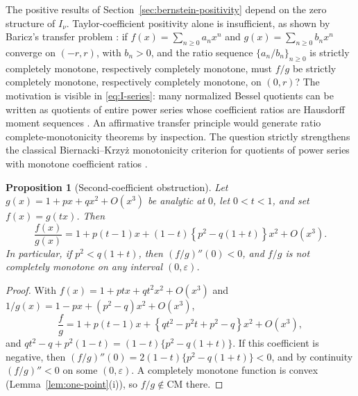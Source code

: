 \documentclass[preprint,12pt]{elsarticle}
\theoremstyle{plain}
\newtheorem{proposition}[theorem]{Proposition}
\theoremstyle{definition}
\theoremstyle{remark}
\newcommand{\CM}{\mathrm{CM}}
\begin{document}
The positive results of Section~\ref{sec:bernstein-positivity} depend on the
zero structure of \(I_\nu\). Taylor-coefficient positivity alone is
insufficient, as shown by Baricz's transfer problem
\cite[Problem~4.3(c)]{baricz-bounds}: if
\(f(x)=\sum_{n\ge0}a_nx^n\) and \(g(x)=\sum_{n\ge0}b_nx^n\) converge on
\((-r,r)\), with \(b_n>0\), and the ratio sequence
\(\{a_n/b_n\}_{n\ge0}\) is strictly completely monotone, respectively
completely monotone, must \(f/g\) be strictly completely monotone,
respectively completely monotone, on \((0,r)\)? The motivation is visible in
\eqref{eq:I-series}: many normalized Bessel quotients can be written as
quotients of entire power series whose coefficient ratios are Hausdorff
moment sequences \cite{hausdorff}. An affirmative transfer principle would
generate ratio complete-monotonicity theorems by inspection. The question
strictly strengthens the classical Biernacki--Krzy\.z monotonicity criterion
for quotients of power series with monotone coefficient ratios
\cite{biernacki-krzyz}.

\begin{proposition}[Second-coefficient obstruction]\label{prop:second-coeff}
Let \(g(x)=1+px+qx^2+O(x^3)\) be analytic at \(0\), let \(0<t<1\), and set
\(f(x)=g(tx)\). Then
\begin{equation}
\frac{f(x)}{g(x)}
=1+p(t-1)x+(1-t)\left\{p^2-q(1+t)\right\}x^2+O(x^3).
\end{equation}
In particular, if \(p^2<q(1+t)\), then \((f/g)''(0)<0\), and \(f/g\) is not
completely monotone on any interval \((0,\varepsilon)\).
\end{proposition}
\begin{proof}
With \(f(x)=1+ptx+qt^2x^2+O(x^3)\) and
\(1/g(x)=1-px+(p^2-q)x^2+O(x^3)\),
\begin{equation}
\frac fg=1+p(t-1)x+\left\{qt^2-p^2t+p^2-q\right\}x^2+O(x^3),
\end{equation}
and \(qt^2-q+p^2(1-t)=(1-t)\{p^2-q(1+t)\}\). If this coefficient is
negative, then \((f/g)''(0)=2(1-t)\{p^2-q(1+t)\}<0\), and by continuity
\((f/g)''<0\) on some \((0,\varepsilon)\). A completely monotone function is
convex (Lemma~\ref{lem:one-point}(i)), so \(f/g\notin\CM\) there.
\end{proof}
\end{document}
